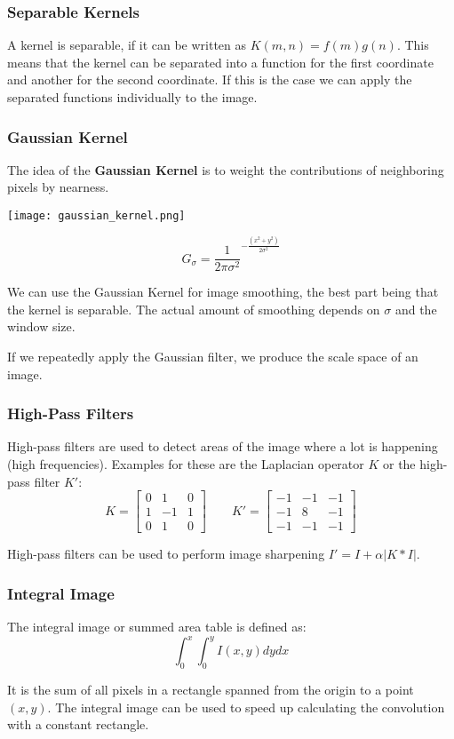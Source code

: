 \subsubsection{Separable Kernels}

A kernel is separable, if it can be written as $K(m, n) = f(m) g(n)$. This means that the kernel can be separated into a function for the first coordinate and another for the second coordinate. If this is the case we can apply the separated functions individually to the image.

\subsubsection{Gaussian Kernel}

The idea of the \textbf{Gaussian Kernel} is to weight the contributions of neighboring pixels by nearness.

\begin{center}
	\texttt{[image: gaussian\_kernel.png]}
\end{center}
$$G_\sigma = \frac{1}{2 \pi \sigma^2}^{- \frac{(x^2 + y^2)}{2 \sigma^2}}$$

We can use the Gaussian Kernel for image smoothing, the best part being that the kernel is separable. The actual amount of smoothing depends on $\sigma$ and the window size. \medskip

If we repeatedly apply the Gaussian filter, we produce the scale space of an image.

\subsubsection{High-Pass Filters}

High-pass filters are used to detect areas of the image where a lot is happening (high frequencies). Examples for these are the Laplacian operator $K$ or the high-pass filter $K'$:
$$ K = 
\begin{bmatrix}
    0 & 1 & 0\\
    1 & -1 & 1\\
    0 & 1 & 0
\end{bmatrix}
\qquad
K' =
\begin{bmatrix}
    -1 & -1 & -1\\
    -1 & 8 & -1\\
    -1 & -1 & -1
\end{bmatrix}
$$

High-pass filters can be used to perform image sharpening $I' = I + \alpha |K * I|$.

\subsubsection{Integral Image}

The integral image or summed area table is defined as:
$$\int_0^x \int_0^y I(x,y)dydx$$

It is the sum of all pixels in a rectangle spanned from the origin to a point $(x,y)$. The integral image can be used to speed up calculating the convolution with a constant rectangle.
